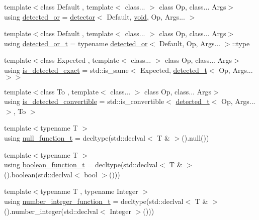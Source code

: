 \begin{DoxyCompactItemize}
\item 
{\footnotesize template$<$class Default , template$<$ class... $>$ class Op, class... Args$>$ }\\using \hyperlink{namespacenlohmann_1_1detail_a240ce21919ab08e8a6cb3a5cfa412bce}{detected\+\_\+or} = \hyperlink{structnlohmann_1_1detail_1_1detector}{detector}$<$ Default, \hyperlink{namespacenlohmann_1_1detail_a59fca69799f6b9e366710cb9043aa77d}{void}, Op, Args... $>$
\item 
{\footnotesize template$<$class Default , template$<$ class... $>$ class Op, class... Args$>$ }\\using \hyperlink{namespacenlohmann_1_1detail_a7ac5b8ef0363101275a2827b3b117dcf}{detected\+\_\+or\+\_\+t} = typename \hyperlink{namespacenlohmann_1_1detail_a240ce21919ab08e8a6cb3a5cfa412bce}{detected\+\_\+or}$<$ Default, Op, Args... $>$\+::type
\item 
{\footnotesize template$<$class Expected , template$<$ class... $>$ class Op, class... Args$>$ }\\using \hyperlink{namespacenlohmann_1_1detail_aa5a24092e12003ae73ae457b0dd29abd}{is\+\_\+detected\+\_\+exact} = std\+::is\+\_\+same$<$ Expected, \hyperlink{namespacenlohmann_1_1detail_a37e97a32d0b94ce5f745427e4e40204d}{detected\+\_\+t}$<$ Op, Args... $>$$>$
\item 
{\footnotesize template$<$class To , template$<$ class... $>$ class Op, class... Args$>$ }\\using \hyperlink{namespacenlohmann_1_1detail_a5262e531c46e357b33007060f294673b}{is\+\_\+detected\+\_\+convertible} = std\+::is\+\_\+convertible$<$ \hyperlink{namespacenlohmann_1_1detail_a37e97a32d0b94ce5f745427e4e40204d}{detected\+\_\+t}$<$ Op, Args... $>$, To $>$
\item 
{\footnotesize template$<$typename T $>$ }\\using \hyperlink{namespacenlohmann_1_1detail_ac1b4e524746bf8b790b2b776048b93c4}{null\+\_\+function\+\_\+t} = decltype(std\+::declval$<$ T \& $>$().null())
\item 
{\footnotesize template$<$typename T $>$ }\\using \hyperlink{namespacenlohmann_1_1detail_a45ec87326503b8884b664a9ef23a6c99}{boolean\+\_\+function\+\_\+t} = decltype(std\+::declval$<$ T \& $>$().boolean(std\+::declval$<$ bool $>$()))
\item 
{\footnotesize template$<$typename T , typename Integer $>$ }\\using \hyperlink{namespacenlohmann_1_1detail_a4a3e14a011b9ea1ff849fc6d2411e6a0}{number\+\_\+integer\+\_\+function\+\_\+t} = decltype(std\+::declval$<$ T \& $>$().number\+\_\+integer(std\+::declval$<$ Integer $>$()))
$$
\end{DoxyCompactItemize}
